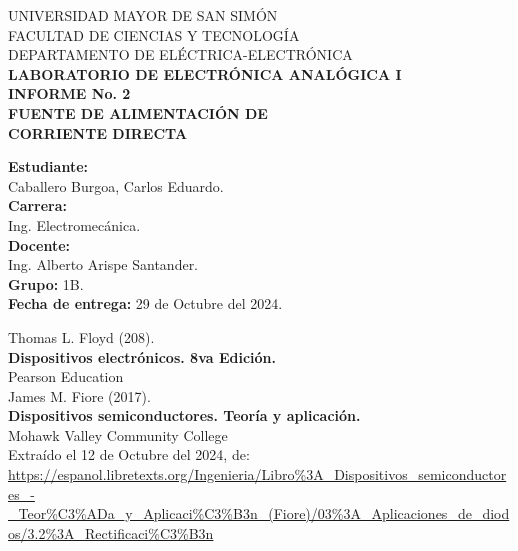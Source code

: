 \documentclass[letter,twoside,11pt]{article}
\newcommand{\blankpage}{
\newpage
\thispagestyle{empty}
\mbox{}
\newpage
}
\begin{document}
\begin{titlepage}
    \begin{center}
        {\Large UNIVERSIDAD MAYOR DE SAN SIMÓN}\\
        \vspace*{0.15cm}
        {\large FACULTAD DE CIENCIAS Y TECNOLOGÍA}\\
        \vspace*{0.10cm}
        DEPARTAMENTO DE ELÉCTRICA-ELECTRÓNICA\\
        \vspace*{3.0cm}
        {\Large \textbf{LABORATORIO DE ELECTRÓNICA ANALÓGICA I}}\\
        \vspace*{0.3cm}
        {\Large \textbf{INFORME No. 2}}\\
        \vspace*{3.5cm}
        {\Large \textbf{FUENTE DE ALIMENTACIÓN DE \\
        CORRIENTE DIRECTA}}\\
    \end{center}

    \vspace*{5.8cm}
    \leftskip=7.95cm
    \noindent
    \textbf{Estudiante:}\\
    Caballero Burgoa, Carlos Eduardo.\\
    \newline
    \textbf{Carrera:}\\
    Ing. Electromecánica.\\
    \newline
    \textbf{Docente:}\\
    Ing. Alberto Arispe Santander.\\
    \newline
    \textbf{Grupo:} 1B.\\
    \textbf{Fecha de entrega:} 29 de Octubre del 2024.\\
\end{titlepage}
\addtocounter{page}{-1}

\blankpage
\addtocounter{page}{-1}









\begin{thebibliography}{99}

Thomas L. Floyd (208).\\
\textbf{Dispositivos electrónicos. 8va Edición.}\\
Pearson Education\\

James M. Fiore (2017).\\
\textbf{Dispositivos semiconductores. Teoría y aplicación.}\\
Mohawk Valley Community College\\
Extraído el 12 de Octubre del 2024, de: \\
\url{https://espanol.libretexts.org/Ingenieria/Libro%3A_Dispositivos_semiconductores_-_Teor%C3%ADa_y_Aplicaci%C3%B3n_(Fiore)/03%3A_Aplicaciones_de_diodos/3.2%3A_Rectificaci%C3%B3n}

\end{thebibliography}
\end{document}
